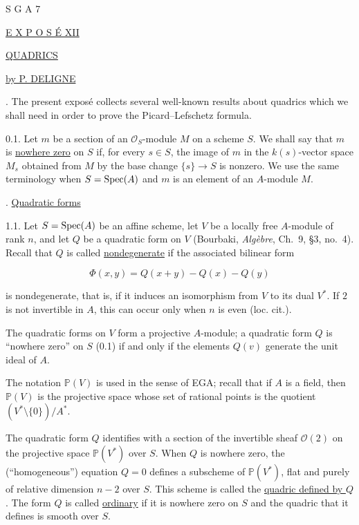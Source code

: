 \clearpage
\begin{center}
S G A 7

\bigskip
\underline{E X P O S É XII}

\bigskip
\underline{QUADRICS}

\bigskip
\underline{by P. DELIGNE}
\end{center}

. The present exposé collects several well-known results about
quadrics which we shall need in order to prove the Picard--Lefschetz
formula.

0.1. Let $m$ be a section of an $\mathcal O_S$-module $M$ on a scheme
$S$.  We shall say that $m$ is \underline{nowhere zero} on $S$ if, for
every $s\in S$, the image of $m$ in the $k(s)$-vector space $M_s$ obtained
from $M$ by the base change $\{s\}\longrightarrow S$ is nonzero.  We use
the same terminology when $S=\operatorname{Spec}(A)$ and $m$ is an element of an
$A$-module $M$.

. \underline{Quadratic forms}

1.1. Let $S=\operatorname{Spec}(A)$ be an affine scheme, let $V$ be a locally free
$A$-module of rank $n$, and let $Q$ be a quadratic form on $V$
(Bourbaki, \emph{Algèbre}, Ch.~9, \S3, no.~4).  Recall that $Q$ is called
\underline{nondegenerate} if the associated bilinear form

\begin{equation*}
\Phi(x,y)=Q(x+y)-Q(x)-Q(y)
\end{equation*}

is nondegenerate, that is, if it induces an isomorphism from $V$ to its
dual $V^*$.  If $2$ is not invertible in $A$, this can occur only when
$n$ is even (loc. cit.).


The quadratic forms on $V$ form a projective $A$-module; a quadratic form
$Q$ is ``nowhere zero'' on $S$ (0.1) if and only if the elements $Q(v)$
generate the unit ideal of $A$.

The notation $\mathbb P(V)$ is used in the sense of EGA; recall that if
$A$ is a field, then $\mathbb P(V)$ is the projective space whose set of
rational points is the quotient $(V^*\setminus\{0\})/A^*$.

The quadratic form $Q$ identifies with a section of the invertible sheaf
$\mathcal O(2)$ on the projective space $\mathbb P(V^*)$ over $S$.  When
$Q$ is nowhere zero, the (``homogeneous'') equation $Q=0$ defines a
subscheme of $\mathbb P(V^*)$, flat and purely of relative dimension
$n-2$ over $S$.  This scheme is called the \underline{quadric defined by
$Q$}.  The form $Q$ is called \underline{ordinary} if it is nowhere zero
on $S$ and the quadric that it defines is smooth over $S$.

